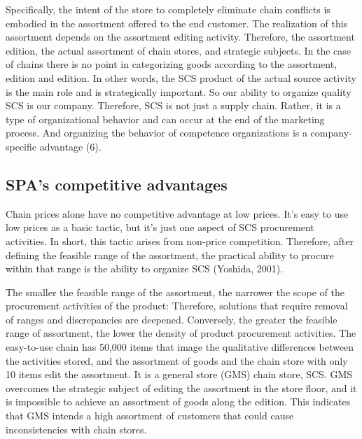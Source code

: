 \documentclass[12pt,]{article}
\begin{document}
Specifically, the intent of the store to completely eliminate chain
conflicts is embodied in the assortment offered to the end customer. The
realization of this assortment depends on the assortment editing
activity. Therefore, the assortment edition, the actual assortment of
chain stores, and strategic subjects. In the case of chains there is no
point in categorizing goods according to the assortment, edition and
edition. In other words, the SCS product of the actual source activity
is the main role and is strategically important. So our ability to
organize quality SCS is our company. Therefore, SCS is not just a supply
chain. Rather, it is a type of organizational behavior and can occur at
the end of the marketing process. And organizing the behavior of
competence organizations is a company-specific advantage (6).

\hypertarget{spas-competitive-advantages}{%
\subsection{SPA's competitive
advantages}\label{spas-competitive-advantages}}

Chain prices alone have no competitive advantage at low prices. It's
easy to use low prices as a basic tactic, but it's just one aspect of
SCS procurement activities. In short, this tactic arises from non-price
competition. Therefore, after defining the feasible range of the
assortment, the practical ability to procure within that range is the
ability to organize SCS (Yoshida, 2001).

The smaller the feasible range of the assortment, the narrower the scope
of the procurement activities of the product: Therefore, solutions that
require removal of ranges and discrepancies are deepened. Conversely,
the greater the feasible range of assortment, the lower the density of
product procurement activities. The easy-to-use chain has 50,000 items
that image the qualitative differences between the activities stored,
and the assortment of goods and the chain store with only 10 items edit
the assortment. It is a general store (GMS) chain store, SCS. GMS
overcomes the strategic subject of editing the assortment in the store
floor, and it is impossible to achieve an assortment of goods along the
edition. This indicates that GMS intends a high assortment of customers
that could cause inconsistencies with chain stores.
\end{document}
